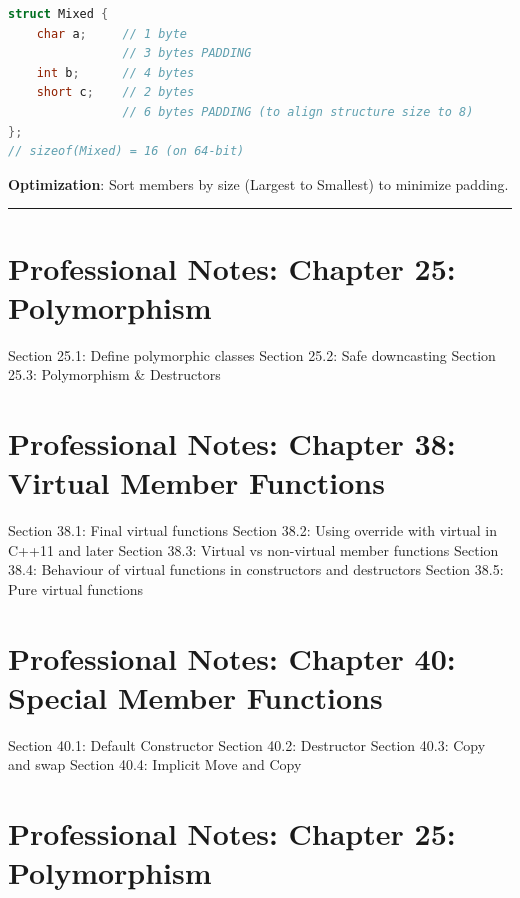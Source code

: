 \begin{lstlisting}[language={C++}]
struct Mixed {
    char a;     // 1 byte
                // 3 bytes PADDING
    int b;      // 4 bytes
    short c;    // 2 bytes
                // 6 bytes PADDING (to align structure size to 8)
};
// sizeof(Mixed) = 16 (on 64-bit)
\end{lstlisting}

\textbf{Optimization}: Sort members by size (Largest to Smallest) to
minimize padding.

\begin{center}\rule{0.5\linewidth}{0.5pt}\end{center}

\hypertarget{professional-notes-chapter-25-polymorphism}{%
\chapter{Professional Notes: Chapter 25:
Polymorphism}\label{professional-notes-chapter-25-polymorphism}}

Section 25.1: Deﬁne polymorphic classes Section 25.2: Safe downcasting
Section 25.3: Polymorphism \& Destructors

\hypertarget{professional-notes-chapter-38-virtual-member-functions}{%
\chapter{Professional Notes: Chapter 38: Virtual Member
Functions}\label{professional-notes-chapter-38-virtual-member-functions}}

Section 38.1: Final virtual functions Section 38.2: Using override with
virtual in C++11 and later Section 38.3: Virtual vs non-virtual member
functions Section 38.4: Behaviour of virtual functions in constructors
and destructors Section 38.5: Pure virtual functions

\hypertarget{professional-notes-chapter-40-special-member-functions}{%
\chapter{Professional Notes: Chapter 40: Special Member
Functions}\label{professional-notes-chapter-40-special-member-functions}}

Section 40.1: Default Constructor Section 40.2: Destructor Section 40.3:
Copy and swap Section 40.4: Implicit Move and Copy

\hypertarget{professional-notes-chapter-25-polymorphism-1}{%
\chapter{Professional Notes: Chapter 25:
Polymorphism}\label{professional-notes-chapter-25-polymorphism-1}}


